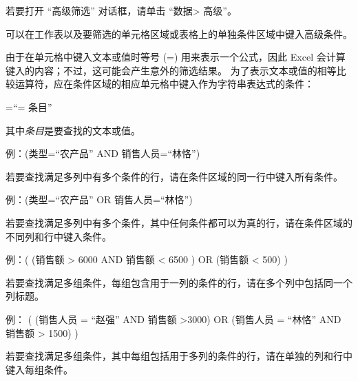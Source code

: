 若要打开 “高级筛选” 对话框，请单击 “数据> 高级”。

可以在工作表以及要筛选的单元格区域或表格上的单独条件区域中键入高级条件。


由于在单元格中键入文本或值时等号 (=) 用来表示一个公式，因此 Excel 会计算键入的内容；不过，这可能会产生意外的筛选结果。 为了表示文本或值的相等比较运算符，应在条件区域的相应单元格中键入作为字符串表达式的条件：

=“= 条目”

其中\emph{条目}是要查找的文本或值。


例：(类型=“农产品” AND 销售人员=“林恪”)

若要查找满足多列中有多个条件的行，请在条件区域的同一行中键入所有条件。


例：(类型=“农产品” OR 销售人员=“林恪”)

若要查找满足多列中有多个条件，其中任何条件都可以为真的行，请在条件区域的不同列和行中键入条件。


例：( (销售额 > 6000 AND 销售额 < 6500 ) OR (销售额 < 500) )

若要查找满足多组条件，每组包含用于一列的条件的行，请在多个列中包括同一个列标题。


例： ( (销售人员 = “赵强” AND 销售额 >3000) OR (销售人员 = “林恪” AND 销售额 > 1500) )

若要查找满足多组条件，其中每组包括用于多列的条件的行，请在单独的列和行中键入每组条件。

